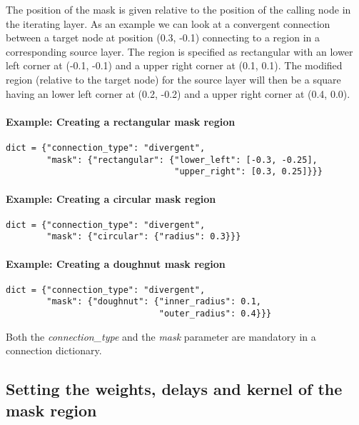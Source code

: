 \documentclass{article}
\begin{document}
The position of the mask is given relative to the position of the calling node in the iterating layer. As an example we can look at a convergent connection between a target node at position (0.3, -0.1) connecting to a region in a corresponding source layer. The region is specified as rectangular with an lower left corner at (-0.1, -0.1) and a upper right corner at (0.1, 0.1). The modified region (relative to the target node) for the source layer will then be a square having an lower left corner at (0.2, -0.2) and a upper right corner at (0.4, 0.0).

\paragraph{Example: Creating a rectangular mask region}

\begin{verbatim}
dict = {"connection_type": "divergent",
        "mask": {"rectangular": {"lower_left": [-0.3, -0.25],
                                 "upper_right": [0.3, 0.25]}}}
\end{verbatim}

\paragraph{Example: Creating a circular mask region}

\begin{verbatim}
dict = {"connection_type": "divergent",
        "mask": {"circular": {"radius": 0.3}}} 
\end{verbatim}

\paragraph{Example: Creating a doughnut mask region}

\begin{verbatim}
dict = {"connection_type": "divergent", 
        "mask": {"doughnut": {"inner_radius": 0.1,
                              "outer_radius": 0.4}}} 
\end{verbatim}

\noindent Both the \emph{connection\_type} and the \emph{mask} parameter are mandatory in a connection dictionary.

\subsection{Setting the weights, delays and kernel of the mask region}
\end{document}
